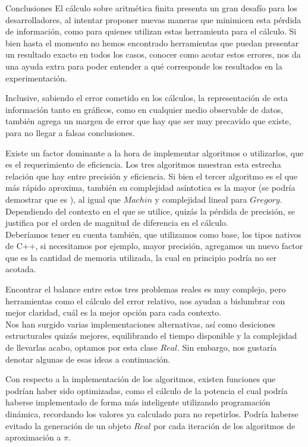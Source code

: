 \begin{section}{Conclusiones}
	El cálculo sobre aritmética finita presenta un gran desafío para los desarrolladores, al intentar proponer nuevas maneras que minimicen esta pérdida de información, como para quienes utilizan estas herramienta para el cálculo. Si bien hasta el momento no hemos encontrado herramientas que puedan presentar un resultado exacto en todos los casos, conocer como acotar estos errores, nos da una ayuda extra para poder entender a qué corresponde los resultados en la experimentación.

	Inclusive, sabiendo el error cometido en los cálculos, la representación de esta información tanto en gráficos, como en cualquier medio observable de datos, también agrega un margen de error que hay que ser muy precavido que existe, para no llegar a falsas conclusiones.
	
	Existe un factor dominante a la hora de implementar algoritmos o utilizarlos, que es el requerimiento de eficiencia. Los tres algoritmos muestran esta estrecha relación que hay entre precisión y eficiencia. Si bien el tercer algoritmo es el que más rápido aproxima, también su complejidad asíntotica es la mayor (se podría demostrar que es ), al igual que $Machin$ y complejidad lineal para $Gregory$. Dependiendo del contexto en el que se utilice, quizás la pérdida de precisión, se justifica por el orden de magnitud de diferencia en el cálculo.\\
	
	Deberíamos tener en cuenta también, que utilizamos como base, los tipos nativos de C++, si necesitamos por ejemplo, mayor precisión, agregamos un nuevo factor que es la cantidad de memoria utilizada, la cual en principio podría no ser acotada.
	
	Encontrar el balance entre estos tres problemas reales es muy complejo, pero herramientas como el cálculo del error relativo, nos ayudan a bislumbrar con mejor claridad, cuál es la mejor opción para cada contexto.\\
	
	Nos han surgido varias implementaciones alternativas, así como desiciones estructurales quizás mejores, equilibrando el tiempo disponible y la complejidad de llevarlas acabo, optamos por esta clase $Real$. Sin embargo, nos gustaría denotar algunas de esas ideas a continuación.
	
	Con respecto a la implementación de los algoritmos, existen funciones que podrían haber sido optimizadas, como el cálculo de la potencia el cual podría haberse implementado de forma más inteligente utilizando programación dinámica, recordando los valores ya calculado para no repetirlos. Podría haberse evitado la generación de un objeto $Real$ por cada iteración de los algoritmos de aproximación a $\pi$.


\end{section}
